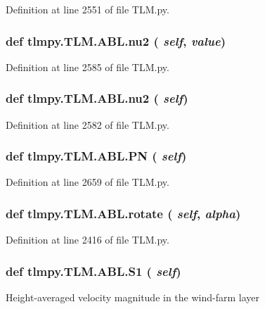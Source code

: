 Definition at line 2551 of file TLM.py.\hypertarget{classtlmpy_1_1TLM_1_1ABL_a8e91f684bbff6dc195f93424cb78be1c}{
\subsubsection[{nu2}]{\setlength{\rightskip}{0pt plus 5cm}def tlmpy.TLM.ABL.nu2 ( {\em self}, \/   {\em value})}}
\label{classtlmpy_1_1TLM_1_1ABL_a8e91f684bbff6dc195f93424cb78be1c}


Definition at line 2585 of file TLM.py.\hypertarget{classtlmpy_1_1TLM_1_1ABL_a8e91f684bbff6dc195f93424cb78be1c}{
\subsubsection[{nu2}]{\setlength{\rightskip}{0pt plus 5cm}def tlmpy.TLM.ABL.nu2 ( {\em self})}}
\label{classtlmpy_1_1TLM_1_1ABL_a8e91f684bbff6dc195f93424cb78be1c}


Definition at line 2582 of file TLM.py.\hypertarget{classtlmpy_1_1TLM_1_1ABL_a81cb0928b83866d15295a6f570fa673c}{
\subsubsection[{PN}]{\setlength{\rightskip}{0pt plus 5cm}def tlmpy.TLM.ABL.PN ( {\em self})}}
\label{classtlmpy_1_1TLM_1_1ABL_a81cb0928b83866d15295a6f570fa673c}


Definition at line 2659 of file TLM.py.\hypertarget{classtlmpy_1_1TLM_1_1ABL_a01974ee89c87730b7ac124961b018a8a}{
\subsubsection[{rotate}]{\setlength{\rightskip}{0pt plus 5cm}def tlmpy.TLM.ABL.rotate ( {\em self}, \/   {\em alpha})}}
\label{classtlmpy_1_1TLM_1_1ABL_a01974ee89c87730b7ac124961b018a8a}


Definition at line 2416 of file TLM.py.\hypertarget{classtlmpy_1_1TLM_1_1ABL_afe5a9138d52b3e85b1ece9d0298810f0}{
\subsubsection[{S1}]{\setlength{\rightskip}{0pt plus 5cm}def tlmpy.TLM.ABL.S1 ( {\em self})}}
\label{classtlmpy_1_1TLM_1_1ABL_afe5a9138d52b3e85b1ece9d0298810f0}
\begin{DoxyVerb}Height-averaged velocity magnitude in the wind-farm layer\end{DoxyVerb}
 

